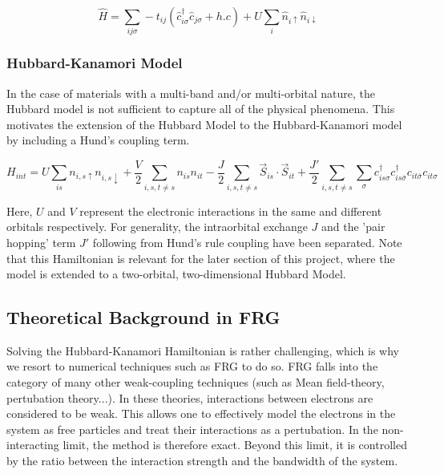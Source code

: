 \documentclass[12pt]{article}
\begin{document}
\begin{equation}\label{t Hubbard model}
    \hat{H} = \sum_{ij\sigma} -t_{ij}(\hat{c}_{i\sigma}^{\dagger}\hat{c}_{j \sigma} + h.c) 
    + U \sum_{i} \hat{n}_{i \uparrow} \hat{n}_{i \downarrow}
\end{equation}





\subsubsection{Hubbard-Kanamori Model}
In the case of materials with a multi-band and/or multi-orbital nature, the Hubbard model is not sufficient to capture all of the physical phenomena. This motivates the extension of the Hubbard Model to the Hubbard-Kanamori model by including a Hund's coupling term.

\begin{equation} \label{Hubbard-Kanamori Model}
    H_{int} = U \sum_{is}n_{i,s\uparrow}n_{i,s\downarrow} + \frac{V}{2} \sum_{i,s,t \neq s} n_{is}n_{it} -\frac{J}{2} \sum_{i,s,t \neq s} \vec{S}_{is} \cdot \vec{S}_{it} 
    + \frac{J'}{2} \sum_{i,s,t \neq s} \sum_{\sigma} c_{is\sigma}^{\dagger}c_{is\bar{\sigma}}^{\dagger}c_{it\bar{\sigma}}c_{it\sigma}
\end{equation}

\noindent Here, $U$ and $V$ represent the electronic interactions in the same and different orbitals respectively. For generality, the intraorbital exchange $J$ and the 'pair hopping' term $J'$ following from Hund's rule coupling have been separated.  
Note that this Hamiltonian is relevant for the later section of this project, where the model is extended to a two-orbital, two-dimensional Hubbard Model.

\subsection{Theoretical Background in FRG}

Solving the Hubbard-Kanamori Hamiltonian is rather challenging, which is why we resort to numerical techniques such as FRG to do so. FRG falls into the category of many other weak-coupling techniques (such as Mean field-theory, pertubation theory...).
In these theories, interactions between electrons are considered to be weak. This allows one to effectively model the electrons in the system as free particles 
and treat their interactions as a pertubation. In the non-interacting limit, the method is therefore exact. Beyond this limit, it is controlled by the ratio between the interaction
strength and the bandwidth of the system. 
\end{document}
